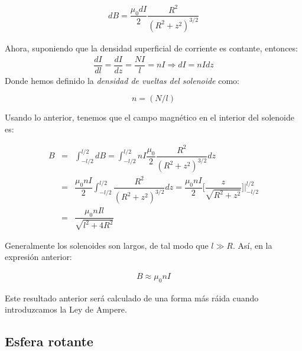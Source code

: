\begin{eqnarray}
dB=\dfrac{\mu_0 dI}{2}\dfrac{R^{2}}{(R^{2}+z^{2})^{3/2}}
\end{eqnarray}

Ahora, suponiendo que la densidad superficial de corriente es contante, entonces:
\begin{eqnarray}
\dfrac{dI}{dl}=\dfrac{dI}{dz}=\dfrac{NI}{l}=nI \Rightarrow dI=nIdz
\end{eqnarray}
Donde hemos definido la \textit{densidad de vueltas del solenoide} como:

\begin{equation}
n=(N/l)
\end{equation}

Usando lo anterior, tenemos que el campo magnético en el interior del solenoide es:

\begin{eqnarray}
\nonumber
B&=&\int_{-l/2}^{l/2}dB=\int_{-l/2}^{l/2}nI \dfrac{\mu_0}{2}\dfrac{R^{2}}{(R^{2}+z^{2})^{3/2}}dz \\ \nonumber
&=&\dfrac{\mu_0 nI}{2}	\int_{-l/2}^{l/2}\dfrac{R^{2}}{(R^{2}+z^{2})^{3/2}}dz
=\dfrac{\mu_0 nI}{2}\Big[\dfrac{z}{\sqrt{R^{2}+z^{2}}}\Big]\Big |_{-l/2}^{l/2}\\
&=&\dfrac{\mu_0 n Il}{\sqrt{l^{2}+4R^{2}}}
\end{eqnarray}

Generalmente los solenoides son largos, de tal modo que $l\gg R$. Así, en la expresión anterior:

\begin{eqnarray}
B \approx \mu_0 nI
\end{eqnarray}

Este resultado anterior será calculado de una forma más ráida cuando introduzcamos la Ley de Ampere.

\subsection*{Esfera rotante}

%


